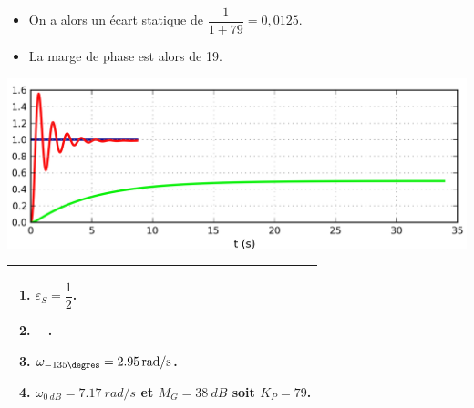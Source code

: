 \documentclass[10pt,fleqn]{article} %
\begin{document}
\begin{multicols}{2}
\begin{corrige}
\begin{itemize}
\item On a alors un écart statique de $\dfrac{1}{1+79}=0,0125$.

\item La marge de phase est alors de 19\degres. 
\end{itemize}

\begin{center}
\includegraphics[width=.9\linewidth]{images/01_03}
\end{center}

\end{corrige}
\else
\fi


\noindent
\begin{tabular}{|p{.9\linewidth}|}
\hline
\begin{enumerate}
\item $\varepsilon_S=\dfrac{1}{2}$.
\item $\quad$.
\item $\omega_{-135\degres}=\SI{2,95}{rad/s}$.
\item $\omega_{\SI{0}{dB}}=\SI{7,17}{rad/s}$ et $M_G=\SI{38}{dB}$ soit $K_P=79$.
\end{enumerate} \\
\hline
\end{tabular}
\end{multicols}
\ifprof
\else
\begin{center}
\end{center}
\end{document}
